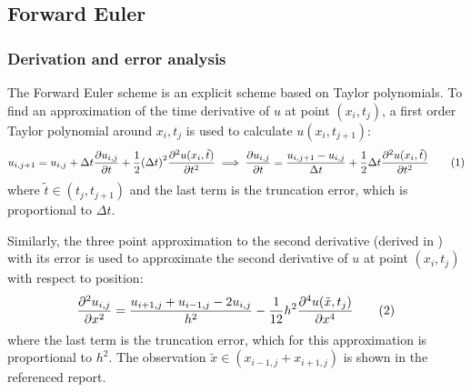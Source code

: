 \documentclass[12pt,english,a4paper]{article}
\newcommand{\eqtag}[1]{\refstepcounter{equation}\tag{\theequation}\label{#1}}
\begin{document}
\subsection{Forward Euler}

\subsubsection{Derivation and error analysis}\label{sec:ForwardEulerDerivation}
The Forward Euler scheme is an explicit scheme based on Taylor polynomials. To find an approximation of the time derivative of \(u\) at point \((x_i,t_j)\), a first order Taylor polynomial around \(x_i,t_j\) is used to calculate \(u(x_i,t_{j+1})\):
\[
    u_{i,j+1} = u_{i,j} + \Delta t\pdv{u_{i,j}}{t} + \frac{1}{2}\qty(\Delta t)^2\pdv[2]{u(x_i,\tilde{t})}{t}
    \implies \pdv{u_{i,j}}{t} = \frac{u_{i,j+1}-u_{i,j}}{\Delta t} + \frac{1}{2}\Delta t\pdv[2]{u(x_i,\tilde{t})}{t}\eqtag{asymmnewton}
\]
where \(\tilde{t}\in(t_j,t_{j+1})\) and the last term is the truncation error, which is proportional to \(\Delta t\).

Similarly, the three point approximation to the second derivative (derived in \autocite{oblig1}) with its error is used to approximate the second derivative of \(u\) at point \((x_i,t_j)\) with respect to position:
\[
    \pdv[2]{u_{i,j}}{x} = \frac{u_{i+1,j} + u_{i-1,j} - 2u_{i,j}}{h^2} - \frac{1}{12}h^2\pdv[4]{u(\tilde{x},t_j)}{x}\eqtag{andrederivert}
\]
where the last term is the truncation error, which for this approximation is proportional to \(h^2\). The observation \(\tilde{x}\in(x_{i-1,j} + x_{i+1,j})\) is shown in the referenced report.
\end{document}
